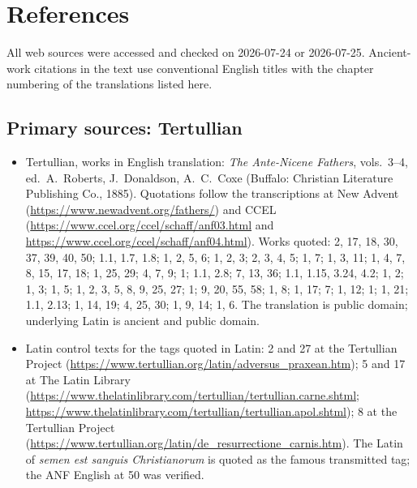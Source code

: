 \section{References}

All web sources were accessed and checked on 2026-07-24 or 2026-07-25.
Ancient-work citations in the text use conventional English titles with the
chapter numbering of the translations listed here.

\subsection*{Primary sources: Tertullian}

\begin{itemize}
\item Tertullian, works in English translation: \textit{The Ante-Nicene
Fathers}, vols.~3--4, ed.\ A.~Roberts, J.~Donaldson, A.~C.~Coxe (Buffalo:
Christian Literature Publishing Co., 1885). Quotations follow the
transcriptions at New Advent (\url{https://www.newadvent.org/fathers/}) and
CCEL (\url{https://www.ccel.org/ccel/schaff/anf03.html} and
\url{https://www.ccel.org/ccel/schaff/anf04.html}). Works quoted:
 2, 17, 18, 30, 37, 39, 40, 50;  1.1, 1.7,
1.8;
 1, 2, 5, 6;  1, 2, 3;
 2, 3, 4, 5;  1, 7;  1, 3, 11;  1, 4, 7, 8, 15, 17, 18;  1, 25, 29;  4, 7, 9;  1; 
1.1, 2.8;  7, 13, 36; 
1.1, 1.15, 3.24, 4.2;  1, 2;  1, 3;  1, 5;  1, 2, 3, 5, 8, 9, 25, 27;  1;  9, 20, 55, 58;  1, 8;  1, 17;  7;  1, 12;  1;  1, 21;  1.1, 2.13;  1, 14, 19; 
4, 25, 30;  1, 9, 14;  1, 6.
The translation is public domain; underlying Latin is ancient and public
domain.
\item Latin control texts for the tags quoted in Latin:  2 and 27 at the Tertullian Project
(\url{https://www.tertullian.org/latin/adversus_praxean.htm});  5 and  17 at The Latin Library
(\url{https://www.thelatinlibrary.com/tertullian/tertullian.carne.shtml};
\url{https://www.thelatinlibrary.com/tertullian/tertullian.apol.shtml});
 8 at the Tertullian Project
(\url{https://www.tertullian.org/latin/de_resurrectione_carnis.htm}). The
Latin of \textit{semen est sanguis Christianorum} is quoted as the famous
transmitted tag; the ANF English at  50 was verified.
\end{itemize}

